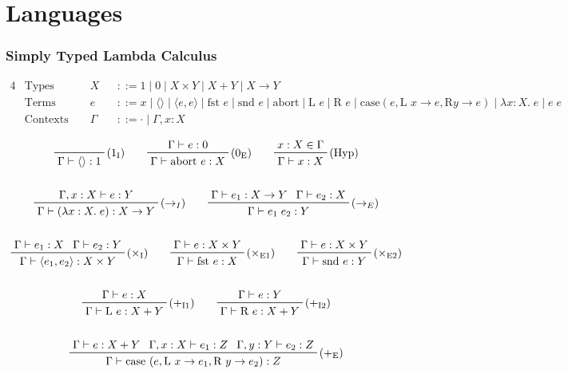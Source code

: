 \documentclass[a4paper,11pt]{article}
\begin{document}
\section{Languages}
{
    \subsubsection*{Simply Typed Lambda Calculus}
    {
        \begin{alignat*}{4}
        &\text{Types } &&X &&::= 1 \mid 0 \mid X \times Y \mid X + Y \mid X \rightarrow Y && \\
        &\text{Terms } &&e &&::= x \mid \langle\rangle \mid \langle e,e \rangle \mid \text{fst } e \mid \text{snd } e
        \mid \text{abort} \mid \text{L } e \mid \text{R } e \mid \text{case}(e,\text{L }x\rightarrow
        e,\text{R}y\rightarrow e) \mid \lambda x:X.\;e \mid e\;e && \\
        &\text{Contexts } &&\Gamma &&::= \cdot \mid \Gamma,x:X &&
        \end{alignat*}

        \begin{gather*}
        \prftree[r]{(\(1_\text{I}\))}
        {\Gamma\vdash\langle\rangle:1}
        \qquad
        \prftree[r]{(\(0_\text{E}\))}
        {\Gamma\vdash e : 0}
        {\Gamma\vdash\text{abort }e : X}
        \qquad
        \prftree[r]{(Hyp)}
        {x:X \in \Gamma}
        {\Gamma\vdash x : X}
        \\
        \\
        \prftree[r]{(\(\rightarrow_I\))}
        {\Gamma, x:X \vdash e : Y}
        {\Gamma\vdash (\lambda x:X.\;e) : X \rightarrow Y}
        \qquad
        \prftree[r]{(\(\rightarrow_E\))}
        {\Gamma\vdash e_1 : X \rightarrow Y}
        {\Gamma\vdash e_2 : X}
        {\Gamma\vdash e_1\;e_2 : Y}
        \\
        \\
        \prftree[r]{(\(\times_\text{I}\))}
        {\Gamma\vdash e_1 : X}
        {\Gamma\vdash e_2 : Y}
        {\Gamma\vdash\langle e_1,e_2 \rangle: X \times Y}
        \qquad
        \prftree[r]{(\(\times_\text{E1}\))}
        {\Gamma\vdash e : X \times Y}
        {\Gamma\vdash\text{fst }e : X}
        \qquad
        \prftree[r]{(\(\times_\text{E2}\))}
        {\Gamma\vdash e : X \times Y}
        {\Gamma\vdash\text{snd }e : Y}
        \\
        \\
        \prftree[r]{(\(+_\text{I1}\))}
        {\Gamma\vdash e : X}
        {\Gamma\vdash \text{L }e : X + Y}
        \qquad
        \prftree[r]{(\(+_\text{I2}\))}
        {\Gamma\vdash e : Y}
        {\Gamma\vdash \text{R }e : X + Y}
        \\
        \\
        \prftree[r]{(\(+_\text{E}\))}
        {\Gamma\vdash e : X + Y}
        {\Gamma,x:X\vdash e_1 : Z}
        {\Gamma,y:Y\vdash e_2 : Z}
        {\Gamma\vdash\text{case }(e, \text{L }x \rightarrow e_1,\text{R }y \rightarrow e_2) : Z}
        \end{gather*}

}}
\end{document}

